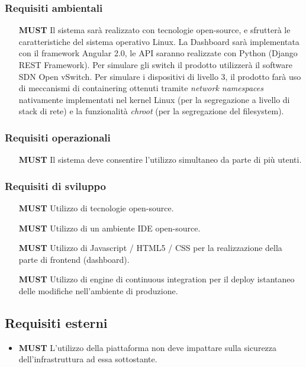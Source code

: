 \documentclass[../main.tex]{subfiles}
\begin{document}
\subsubsection{Requisiti  ambientali}
\begin{itemize}
    \item[\textbf{MUST}] Il sistema sarà realizzato con tecnologie open-source, e sfrutterà le caratteristiche del sistema operativo Linux. La Dashboard sarà implementata con il framework Angular 2.0, le API saranno realizzate con Python (Django REST Framework). Per simulare gli switch il prodotto utilizzerà il software SDN Open vSwitch. Per simulare i dispositivi di livello 3, il prodotto farà uso di meccanismi di containering ottenuti tramite \textit{network namespaces} nativamente implementati nel kernel Linux (per la segregazione a livello di stack di rete) e la funzionalità \textit{chroot} (per la segregazione del filesystem).
\end{itemize}
\subsubsection{Requisiti  operazionali}
\begin{itemize}
    \item[\textbf{MUST}] Il sistema deve consentire l'utilizzo simultaneo da parte di più utenti.
\end{itemize}
\subsubsection{Requisiti di sviluppo}
\begin{itemize}
    \setlength\itemsep{1em}
    \item[\textbf{MUST}] Utilizzo di tecnologie open-source.
    \item[\textbf{MUST}] Utilizzo di un ambiente IDE open-source.
    \item[\textbf{MUST}] Utilizzo di Javascript / HTML5 / CSS per la realizzazione della parte di frontend (dashboard).
    \item[\textbf{MUST}] Utilizzo di engine di continuous integration per il deploy istantaneo delle modifiche nell'ambiente di produzione.
\end{itemize}
\subsection{Requisiti esterni}
\begin {itemize}
    \item[\textbf{MUST}] L'utilizzo della piattaforma non deve impattare sulla sicurezza dell'infrastruttura ad essa sottostante.
\end {itemize}
\end{document}

